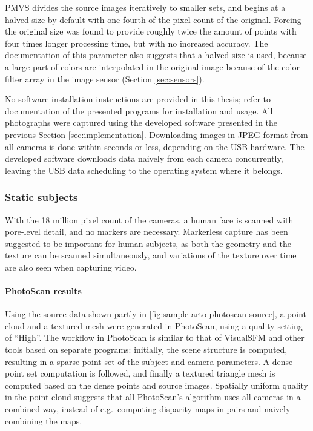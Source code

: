 PMVS divides the source images iteratively to smaller sets, and begins at a halved size by default with one fourth of the pixel count of the original.
Forcing the original size was found to provide roughly twice the amount of points with four times longer processing time, but with no increased accuracy.
The documentation of this parameter also suggests that a halved size is used, because a large part of colors are interpolated in the original image because of the color filter array in the image sensor (Section \ref{sec:sensors}).

No software installation instructions are provided in this thesis; refer to documentation of the presented programs for installation and usage.
All photographs were captured using the developed software presented in the previous Section \ref{sec:implementation}.
Downloading images in JPEG format from all cameras is done within seconds or less, depending on the USB hardware.
The developed software downloads data naively from each camera concurrently, leaving the USB data scheduling to the operating system where it belongs.

\subsubsection{Static subjects}

With the 18 million pixel count of the cameras, a human face is scanned with pore-level detail, and no markers are necessary.
Markerless capture has been suggested to be important for human subjects, as both the geometry and the texture can be scanned simultaneously, and variations of the texture over time are also seen when capturing video. \cite{bradley2010high}

\paragraph{PhotoScan results}
Using the source data shown partly in \ref{fig:sample-arto-photoscan-source}, a point cloud and a textured mesh were generated in PhotoScan, using a quality setting of ``High''.
The workflow in PhotoScan is similar to that of VisualSFM and other tools based on separate programs:
initially, the scene structure is computed, resulting in a sparse point set of the subject and camera parameters.
A dense point set computation is followed, and finally a textured triangle mesh is computed based on the dense points and source images.
Spatially uniform quality in the point cloud suggests that all PhotoScan's algorithm uses all cameras in a combined way, instead of e.g.\ computing disparity maps in pairs and naively combining the maps.

